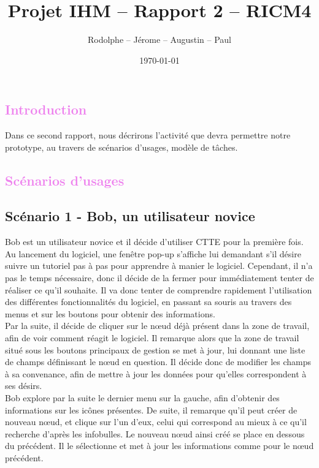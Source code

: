 \documentclass[12pt, a4paper]{article}
\title{Projet IHM -- Rapport 2 -- RICM4}
\author{\bsc{Fréby} Rodolphe -- \bsc{Barbier} Jérome -- \bsc{Husson} Augustin -- \bsc{Labat} Paul}
\date{\today}
\begin{document}
\maketitle
\tableofcontents
\newpage

\textcolor{Violet}{\section{Introduction}}
Dans ce second rapport, nous décrirons l'activité que devra permettre notre prototype, au travers de scénarios d'usages, modèle de tâches.

\textcolor{Violet}{\section{Scénarios d'usages}}
\textcolor{NavyBlue}{\subsection{Scénario 1 - Bob, un utilisateur novice}}


Bob est un utilisateur novice et il décide d'utiliser CTTE pour la première fois. Au lancement du logiciel, une fenêtre pop-up s'affiche lui demandant s’il désire suivre un tutoriel pas à pas pour apprendre à manier le logiciel. Cependant, il n'a pas le temps nécessaire, donc il décide de la fermer pour immédiatement tenter de réaliser ce qu'il souhaite. Il va donc tenter de comprendre rapidement l'utilisation des différentes fonctionnalités du logiciel, en passant sa souris au travers des menus et sur les boutons pour obtenir des informations.\\ 


Par la suite, il décide de cliquer sur le nœud déjà présent dans la zone de travail, afin de voir comment réagit le logiciel. Il remarque alors que la zone de travail situé sous les boutons principaux de gestion se met à jour, lui donnant une liste de champs définissant le nœud en question. Il décide donc de modifier les champs à sa convenance, afin de mettre à jour les données pour qu'elles correspondent à ses désirs.\\


Bob explore par la suite le dernier menu sur la gauche, afin d'obtenir des informations sur les icônes présentes. De suite, il remarque qu'il peut créer de nouveau nœud, et clique sur l'un d'eux, celui qui correspond au mieux à ce qu'il recherche d'après les infobulles. Le nouveau nœud ainsi créé se place en dessous du précédent. Il le sélectionne et met à jour les informations comme pour le nœud précédent. \\
\end{document}
